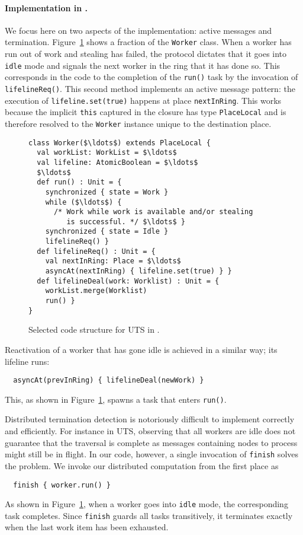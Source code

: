 \paragraph{Implementation in \apgas.} We focus here on two aspects of the
implementation: active messages and termination. Figure~\ref{fig:utsapgas}
shows a fraction of the \lstinline{Worker} class.
When a worker has run out of work and stealing has failed, the protocol
dictates that it goes into \lstinline{idle} mode and signals the next worker in
the ring that it has done so. This corresponds in the code to the completion of
the \lstinline{run()} task by the invocation of \lstinline{lifelineReq()}. This
second method implements an active message pattern: the execution of
\lstinline{lifeline.set(true)} happens at place \lstinline{nextInRing}. This
works because the implicit \lstinline{this} captured in the closure has type
\lstinline{PlaceLocal} and is therefore resolved to the \lstinline{Worker}
instance unique to the destination place.
\begin{figure}
\begin{lstlisting}
class Worker($\ldots$) extends PlaceLocal {
  val workList: WorkList = $\ldots$
  val lifeline: AtomicBoolean = $\ldots$
  $\ldots$
  def run() : Unit = {
    synchronized { state = Work }
    while ($\ldots$) {
      /* Work while work is available and/or stealing
         is successful. */ $\ldots$ }
    synchronized { state = Idle }
    lifelineReq() }
  def lifelineReq() : Unit = {
    val nextInRing: Place = $\ldots$
    asyncAt(nextInRing) { lifeline.set(true) } }
  def lifelineDeal(work: Worklist) : Unit = {
    workList.merge(Worklist)
    run() }
}
\end{lstlisting}
\caption{Selected code structure for UTS in \apgas.\label{fig:utsapgas}}
\end{figure}
Reactivation of a worker that has gone idle is achieved in a similar way; its
lifeline runs:
\begin{lstlisting}
  asyncAt(prevInRing) { lifelineDeal(newWork) }
\end{lstlisting}
This, as shown in Figure~\ref{fig:utsapgas}, spawns a task that enters
\lstinline{run()}.

Distributed termination detection is notoriously difficult to implement
correctly and efficiently. For instance in UTS, observing that all workers are
idle does not guarantee that the traversal is complete as messages containing
nodes to process might still be in flight. In our code, however, a single
invocation of \lstinline{finish} solves the problem.
We invoke our distributed computation from the first place as
\begin{lstlisting}
  finish { worker.run() }
\end{lstlisting}
As shown in Figure~\ref{fig:utsapgas}, when a worker goes into \lstinline{idle}
mode, the corresponding task completes. Since \lstinline{finish} guards all
tasks transitively, it terminates exactly when the last work item has been
exhausted.

